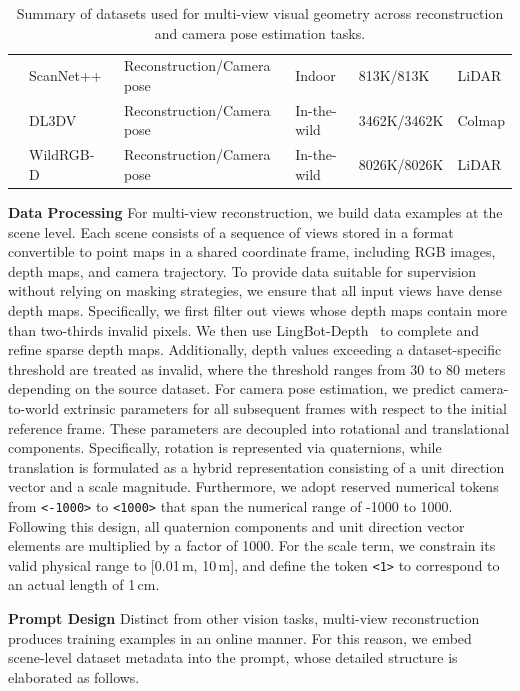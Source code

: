 \begin{table}[htbp]
\begin{tabular}{l|l|l|l|l|l}
        & ScanNet++~\cite{yeshwanth2023scannethighfidelitydataset3d} & Reconstruction/Camera pose & Indoor & 813K/813K & LiDAR \\
        & DL3DV~\cite{ling2023dl3dv10klargescalescenedataset}     & Reconstruction/Camera pose & In-the-wild & 3462K/3462K & Colmap \\
        & WildRGB-D~\cite{xia2024rgbdobjectswildscaling}  & Reconstruction/Camera pose & In-the-wild & 8026K/8026K & LiDAR \\
      \bottomrule
    \end{tabular}
  \caption{
    Summary of datasets used for multi-view visual geometry across reconstruction and camera pose estimation tasks.
  }
  \label{tab:multiview-3d-datasets}
\end{table}

\textbf{Data Processing}
For multi-view reconstruction, we build data examples at the scene level.
Each scene consists of a sequence of views stored in a format convertible to point maps in a shared coordinate frame, including RGB images, depth maps, and camera trajectory.
To provide data suitable for supervision without relying on masking strategies, we ensure that all input views have dense depth maps.
Specifically, we first filter out views whose depth maps contain more than two-thirds invalid pixels.
We then use LingBot-Depth~\cite{lingbotdepth} to complete and refine sparse depth maps.
Additionally, depth values exceeding a dataset-specific threshold are treated as invalid, where the threshold ranges from 30 to 80 meters depending on the source dataset.
For camera pose estimation, we predict camera-to-world extrinsic parameters for all subsequent frames with respect to the initial reference frame.
These parameters are decoupled into rotational and translational components.
Specifically, rotation is represented via quaternions, while translation is formulated as a hybrid representation consisting of a unit direction vector and a scale magnitude.
Furthermore, we adopt reserved numerical tokens from \texttt{<-1000>} to \texttt{<1000>} that span the numerical range of -1000 to 1000.
Following this design, all quaternion components and unit direction vector elements are multiplied by a factor of 1000.
For the scale term, we constrain its valid physical range to [0.01\,m, 10\,m], and define the token \texttt{<1>} to correspond to an actual length of 1\,cm.

\textbf{Prompt Design}
Distinct from other vision tasks, multi-view reconstruction produces training examples in an online manner.
For this reason, we embed scene-level dataset metadata into the prompt, whose detailed structure is elaborated as follows.

